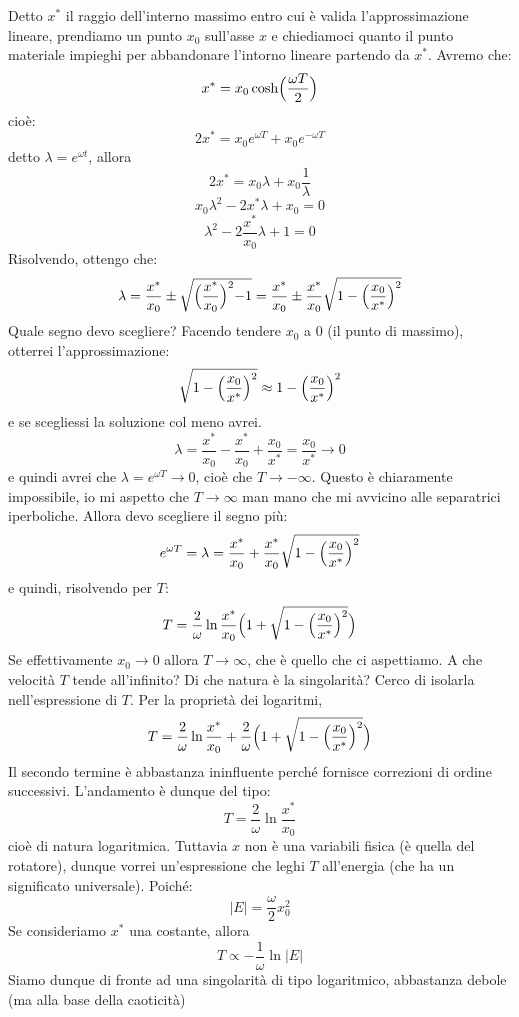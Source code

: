 \documentclass[a4paper,openany]{article}
\begin{document}
	Detto $x^{*}$ il raggio dell'interno massimo entro cui è valida l'approssimazione lineare, prendiamo un punto $x_0$ sull'asse $x$ e chiediamoci quanto il punto materiale impieghi per abbandonare l'intorno lineare partendo da $x^*$. Avremo che:
	$$
	x^* = x_0 \cosh\Bigl(\dfrac{\omega T}{2}\Bigl)
	$$
	cioè:
	$$
	2x^* = x_0 e^{\omega T} + x_0 e^{-\omega T}
	$$
	detto $\lambda = e^{\omega t}$, allora
	$$
	2x^* = x_0 \lambda + x_0 \dfrac{1}{\lambda}
	$$
	$$
	x_0 \lambda^{2} - 2x^{*}\lambda + x_0 = 0
	$$
	$$
	\lambda^{2} - 2\dfrac{x^{*}}{x_0}\lambda + 1 = 0
	$$
	Risolvendo, ottengo che:
	$$
	\lambda = \dfrac{x^{*}}{x_0} \pm \sqrt{\Bigl(\dfrac{x^{*}}{x_0}\Bigl)^2 -1} = \dfrac{x^{*}}{x_0} \pm \dfrac{x^{*}}{x_0} \sqrt{1-\Bigl(\dfrac{x_0}{x^{*}}\Bigl)^2} 
	$$
	Quale segno devo scegliere? Facendo tendere $x_0$ a $0$ (il punto di massimo), otterrei l'approssimazione:
	$$
	\sqrt{1-\Bigl(\dfrac{x_0}{x^{*}}\Bigl)^2} \approx 1- \Bigl(\dfrac{x_0}{x^{*}}\Bigl)^2
	$$
	e se scegliessi la soluzione col meno avrei.
	$$
	\lambda =  \dfrac{x^{*}}{x_0} - \dfrac{x^{*}}{x_0} + \dfrac{x_0}{x^{*}} =  \dfrac{x_0}{x^{*}} \rightarrow 0
	$$
	e quindi avrei che $\lambda = e^{\omega T}\rightarrow 0$, cioè che $T \rightarrow -\infty$. Questo è chiaramente impossibile, io mi aspetto che $T\rightarrow\infty$ man mano che mi avvicino alle separatrici iperboliche. Allora devo scegliere il segno più:
	$$
	e^{\omega T} = \lambda =\dfrac{x^{*}}{x_0} + \dfrac{x^{*}}{x_0} \sqrt{1-\Bigl(\dfrac{x_0}{x^{*}}\Bigl)^2}
	$$
	e quindi, risolvendo per $T$:
	$$
	T = \dfrac{2}{\omega} \ln\dfrac{x^{*}}{x_0}\Bigl(1+\sqrt{1-\Bigl(\dfrac{x_0}{x^{*}}\Bigl)^2}\Bigl)
	$$
	Se effettivamente $x_0 \rightarrow 0$ allora $T\rightarrow\infty$, che è quello che ci aspettiamo. A che velocità $T$ tende all'infinito? Di che natura è la singolarità? Cerco di isolarla nell'espressione di $T$.
	Per la proprietà dei logaritmi,
	$$
	T = \dfrac{2}{\omega} \ln\dfrac{x^{*}}{x_0} + \dfrac{2}{\omega}\Bigl(1+\sqrt{1-\Bigl(\dfrac{x_0}{x^{*}}\Bigl)^2}\Bigl)
	$$
	Il secondo termine è abbastanza ininfluente perché fornisce correzioni di ordine successivi. L'andamento è dunque del tipo:
	$$
	T = \dfrac{2}{\omega} \ln\dfrac{x^{*}}{x_0} 
	$$
	cioè di natura logaritmica. Tuttavia $x$ non è una variabili fisica (è quella del rotatore), dunque vorrei un'espressione che leghi $T$ all'energia (che ha un significato universale). Poiché:
	$$
	|E| = \dfrac{\omega}{2}x_0^2
	$$
	Se consideriamo $x^{*}$ una costante, allora
	$$
	T \propto -\dfrac{1}{\omega} \ln|E|
	$$
	Siamo dunque di fronte ad una singolarità di tipo logaritmico, abbastanza debole (ma alla base della caoticità)
	
\end{document}

